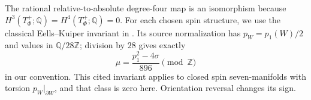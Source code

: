 The rational relative-to-absolute degree-four map is an isomorphism
because $H^3(T^+_\Phi;\mathbb Q)=H^4(T^+_\Phi;\mathbb Q)=0$.
For each chosen spin structure, we use the classical Eells--Kuiper
invariant in \cite[Section~1.4, equations~(2)--(3), p.~5 of
arXiv:1406.2226v3]{mapsCrowleyNordstrom19}. Its source normalization has
$p_W=p_1(W)/2$ and values in $\mathbb Q/28\mathbb Z$; division by $28$
gives exactly
\[
 \mu=\frac{p_1^2-4\sigma}{896}\pmod{\mathbb Z}
\]
in our convention. This cited invariant applies to closed spin
seven-manifolds with torsion $p_W|_{\partial W}$, and that class is zero
here. Orientation reversal changes its sign.
